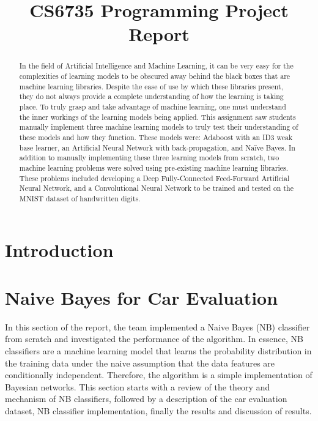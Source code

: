 \documentclass[a4paper]{article}
\title{CS6735 Programming Project Report}
\begin{document}
\maketitle

\begin{abstract}
    In the field of Artificial Intelligence and Machine Learning, it can be very easy for the complexities of learning models to be obscured away behind the black boxes that are machine learning libraries. Despite the ease of use by which these libraries present, they do not always provide a complete understanding of how the learning is taking place. To truly grasp and take advantage of machine learning, one must understand the inner workings of the learning models being applied. This assignment saw students manually implement three machine learning models to truly test their understanding of these models and how they function. These models were: Adaboost with an ID3 weak base learner, an Artificial Neural Network with back-propagation, and Naïve Bayes. In addition to manually implementing these three learning models from scratch, two machine learning problems were solved using pre-existing machine learning libraries. These problems included developing a Deep Fully-Connected Feed-Forward Artificial Neural Network, and a Convolutional Neural Network to be trained and tested on the MNIST dataset of handwritten digits.
\end{abstract}

\newpage

\section{Introduction}

\section{Naive Bayes for Car Evaluation}
In this section of the report, the team implemented a Naive Bayes (NB) classifier from scratch and investigated the performance of the algorithm. In essence, NB classifiers are a machine learning model that learns the probability distribution in the training data under the naive assumption that the data features are conditionally independent. Therefore, the algorithm is a simple implementation of Bayesian networks. This section starts with a review of the theory and mechanism of NB classifiers, followed by a description of the car evaluation dataset, NB classifier implementation, finally the results and discussion of results.
\end{document}
